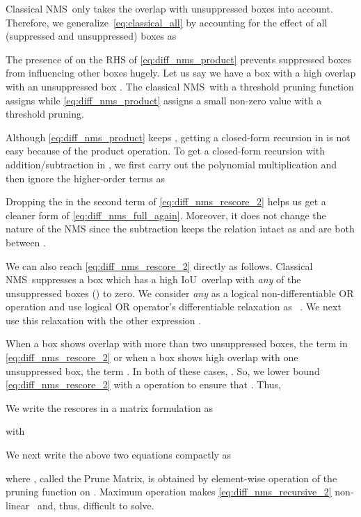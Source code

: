 \documentclass[final]{cvpr}
\newcommand{\iou}{IoU}
\newcommand{\iouTwoD}{\iou}
\newcommand{\classicalNms}{classical NMS}
\newcommand{\classicalNmsCaps}{Classical NMS}
\begin{document}
    \classicalNmsCaps~only takes the overlap with unsuppressed boxes into account. Therefore, we generalize~\eqref{eq:classical_all} by accounting for the 
    effect of all (suppressed and unsuppressed) boxes as
    
    The presence of  on the RHS of \eqref{eq:diff_nms_product} prevents suppressed boxes  from influencing other boxes hugely. 
    Let us say we have a box  with a high overlap with an unsuppressed box . The  \classicalNms~with a threshold pruning function assigns  while \eqref{eq:diff_nms_product} assigns  a small non-zero value with a threshold pruning.
    
    Although \eqref{eq:diff_nms_product} keeps , getting a closed-form recursion in  is not easy because of the product operation. To get a closed-form recursion with addition/subtraction in , we first carry out the polynomial multiplication and then ignore the higher-order terms as
    
    Dropping the  in the second term of \eqref{eq:diff_nms_rescore_2} helps us get a cleaner form of \eqref{eq:diff_nms_full_again}. Moreover, it does not change the nature of the NMS since the subtraction keeps the relation  intact as  and  are both between . 
    
    We can also reach \eqref{eq:diff_nms_rescore_2} directly as follows. \classicalNmsCaps~suppresses a box which has a high \iouTwoD~overlap with \emph{any} of the unsuppressed boxes () to zero. 
    We consider \emph{any} as a logical non-differentiable OR operation and use logical OR  operator's differentiable relaxation as ~\cite{van2020analyzing, li2019augmenting}. 
    We next use this relaxation with the other expression .
    
    When a box shows overlap with more than two unsuppressed boxes, the term  in \eqref{eq:diff_nms_rescore_2} or when a box shows high overlap with one unsuppressed box, the term . In both of these cases, . So, we lower bound \eqref{eq:diff_nms_rescore_2} with a  operation to ensure that . Thus,
    

    We write the rescores  in a matrix formulation as
    
    with
    
    
    We next write the above two equations compactly as
    
    where , called the Prune Matrix, is obtained by element-wise operation of the pruning function  on . Maximum operation makes \eqref{eq:diff_nms_recursive_2} non-linear~\cite{kumar2013estimation} and, thus, difficult to solve. 
    
\end{document}
